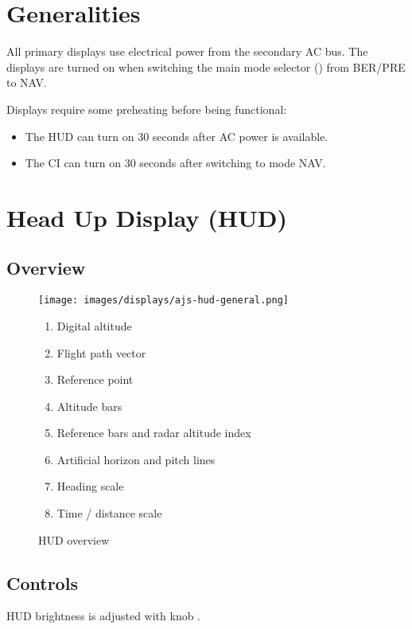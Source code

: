 \section{Generalities}
All primary displays use electrical power from the secondary AC bus.
The displays are turned on when switching the main mode selector
() from BER/PRE to NAV.

Displays require some preheating before being functional:
\begin{itemize}
  \item The HUD can turn on 30 seconds after AC power is available.
  \item The CI can turn on 30 seconds after switching to mode NAV.
\end{itemize}

\section{Head Up Display (HUD)}
\subsection{Overview}
\begin{figure}[!ht]
  \centering
  \texttt{[image: images/displays/ajs-hud-general.png]}

  \begin{multicols}{2}
    \begin{enumerate}[nosep]
      \item \label{item:digalt} Digital altitude
      \item \label{item:fpv} Flight path vector
      \item \label{item:refpt} Reference point
      \item \label{item:alt} Altitude bars
      \item \label{item:refbars} Reference bars and radar altitude index
      \item \label{item:horizon} Artificial horizon and pitch lines
      \item \label{item:heading} Heading scale
      \item \label{item:timeline} Time / distance scale
    \end{enumerate}
  \end{multicols}

  \caption{HUD overview}
  \label{fig:hud}
\end{figure}

\subsection{Controls}
HUD brightness is adjusted with knob .

